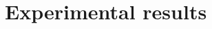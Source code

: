 \documentclass{ifacconf}
\begin{document}
\section{Experimental results} \label{sec:results}




\end{document}
